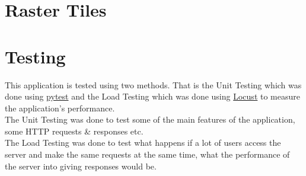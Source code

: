 \section{Raster Tiles}


\section{Testing}
This application is tested using two methods. That is the Unit Testing which was done using \href{https://docs.pytest.org/en/latest/}{pytest} and the Load Testing which was done using \href{https://locust.io/}{Locust} to measure the application's performance.\\
The Unit Testing was done to test some of the main features of the application, some HTTP requests \& responses etc.\\
The Load Testing was done to test what happens if a lot of users access the server and make the same requests at the same time, what the performance of the server into giving responses would be.
